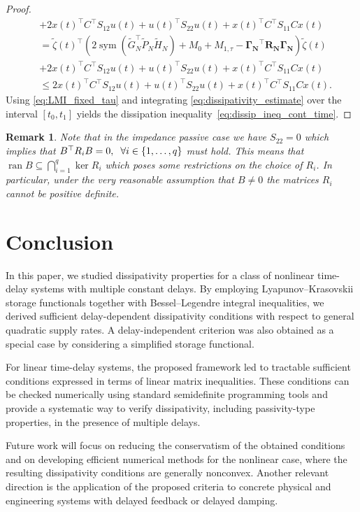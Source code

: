 \documentclass[12pt]{article}
\DeclareMathOperator{\ran}{ran}
\DeclareMathOperator{\sym}{sym}
\newtheorem{remark}{Remark}
\begin{document}
\begin{proof}
\begin{align*}
&+2x(t)^\top C^\top S_{12}u(t)+u(t)^\top S_{22} u(t)+x(t)^\top C^\top S_{11} Cx(t)\\
&=\tilde \zeta(t)^\top(2 \sym( \tilde G_{N}^\top \tilde P_N \tilde H_{N})+ M_0 +M_{1,\tau}-\mathbf{\Gamma_N}^\top \mathbf{R_N}\mathbf{\Gamma_N})\tilde\zeta(t)\\
&+2x(t)^\top C^\top S_{12}u(t)+u(t)^\top S_{22} u(t)+x(t)^\top C^\top S_{11} Cx(t)\\
&\leq 2x(t)^\top C^\top S_{12}u(t)+u(t)^\top S_{22} u(t)+x(t)^\top C^\top S_{11} Cx(t).
\end{align*}
Using \eqref{eq:LMI_fixed_tau} and integrating \eqref{eq:dissipativity_estimate} over the interval $[t_0,t_1]$ yields the dissipation inequality~\eqref{eq:dissip_ineq_cont_time}.
\end{proof}
\begin{remark}
Note that in the impedance passive case we have $S_{22}=0$ which implies that $B^\top R_i B=0, \hspace{2mm} \forall i \in \{ 1,\ldots, q \}$ must hold. This means that $\ran B\subseteq \bigcap\limits_{i=1}^{q} \ker R_i$ which poses some restrictions on the choice of $R_i$. In particular, under the very reasonable assumption that $B\neq 0$ the matrices $R_i$ cannot be positive definite.
\end{remark}
\section{Conclusion}
\label{sec:conclusion}
In this paper, we studied dissipativity properties for a class of nonlinear time-delay systems with multiple constant delays. By employing Lyapunov--Krasovskii storage functionals together with Bessel--Legendre integral inequalities, we derived sufficient delay-dependent dissipativity conditions with respect to general quadratic supply rates. A delay-independent criterion was also obtained as a special case by considering a simplified storage functional.

For linear time-delay systems, the proposed framework led to tractable sufficient conditions expressed in terms of linear matrix inequalities. These conditions can be checked numerically using standard semidefinite programming tools and provide a systematic way to verify dissipativity, including passivity-type properties, in the presence of multiple delays.

Future work will focus on reducing the conservatism of the obtained conditions and on developing efficient numerical methods for the nonlinear case, where the resulting dissipativity conditions are generally nonconvex. Another relevant direction is the application of the proposed criteria to concrete physical and engineering systems with delayed feedback or delayed damping.
\end{document}
